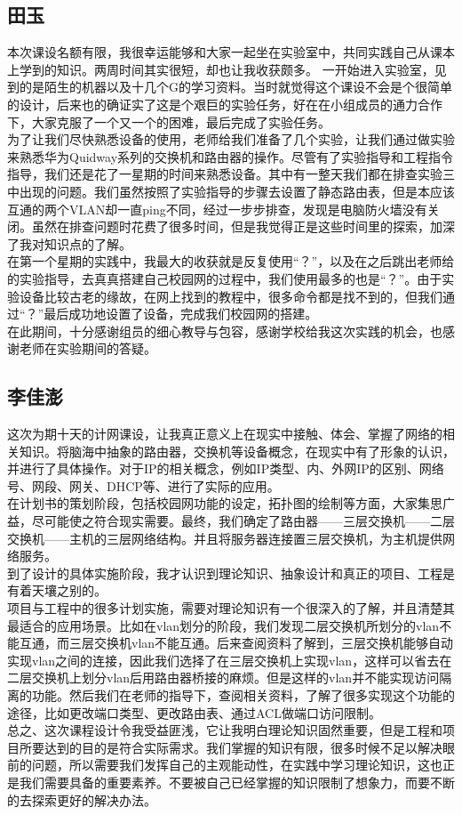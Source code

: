 	\subsection*{田玉}
	本次课设名额有限，我很幸运能够和大家一起坐在实验室中，共同实践自己从课本上学到的知识。两周时间其实很短，却也让我收获颇多。
\indent 一开始进入实验室，见到的是陌生的机器以及十几个G的学习资料。当时就觉得这个课设不会是个很简单的设计，后来也的确证实了这是个艰巨的实验任务，好在在小组成员的通力合作下，大家克服了一个又一个的困难，最后完成了实验任务。\\
\indent 为了让我们尽快熟悉设备的使用，老师给我们准备了几个实验，让我们通过做实验来熟悉华为Quidway系列的交换机和路由器的操作。尽管有了实验指导和工程指令指导，我们还是花了一星期的时间来熟悉设备。其中有一整天我们都在排查实验三中出现的问题。我们虽然按照了实验指导的步骤去设置了静态路由表，但是本应该互通的两个VLAN却一直ping不同，经过一步步排查，发现是电脑防火墙没有关闭。虽然在排查问题时花费了很多时间，但是我觉得正是这些时间里的探索，加深了我对知识点的了解。\\
\indent 在第一个星期的实践中，我最大的收获就是反复使用“？”，以及在之后跳出老师给的实验指导，去真真搭建自己校园网的过程中，我们使用最多的也是“？”。由于实验设备比较古老的缘故，在网上找到的教程中，很多命令都是找不到的，但我们通过“？”最后成功地设置了设备，完成我们校园网的搭建。\\
\indent 在此期间，十分感谢组员的细心教导与包容，感谢学校给我这次实践的机会，也感谢老师在实验期间的答疑。\\
	\subsection*{李佳澎}
\indent	这次为期十天的计网课设，让我真正意义上在现实中接触、体会、掌握了网络的相关知识。将脑海中抽象的路由器，交换机等设备概念，在现实中有了形象的认识，并进行了具体操作。对于IP的相关概念，例如IP类型、内、外网IP的区别、网络号、网段、网关、DHCP等、进行了实际的应用。\\
\indent	在计划书的策划阶段，包括校园网功能的设定，拓扑图的绘制等方面，大家集思广益，尽可能使之符合现实需要。最终，我们确定了路由器——三层交换机——二层交换机——主机的三层网络结构。并且将服务器连接置三层交换机，为主机提供网络服务。\\
\indent	到了设计的具体实施阶段，我才认识到理论知识、抽象设计和真正的项目、工程是有着天壤之别的。\\
\indent 项目与工程中的很多计划实施，需要对理论知识有一个很深入的了解，并且清楚其最适合的应用场景。比如在vlan划分的阶段，我们发现二层交换机所划分的vlan不能互通，而三层交换机vlan不能互通。后来查阅资料了解到，三层交换机能够自动实现vlan之间的连接，因此我们选择了在三层交换机上实现vlan，这样可以省去在二层交换机上划分vlan后用路由器桥接的麻烦。但是这样的vlan并不能实现访问隔离的功能。然后我们在老师的指导下，查阅相关资料，了解了很多实现这个功能的途径，比如更改端口类型、更改路由表、通过ACL做端口访问限制。\\
\indent	总之、这次课程设计令我受益匪浅，它让我明白理论知识固然重要，但是工程和项目所要达到的目的是符合实际需求。我们掌握的知识有限，很多时候不足以解决眼前的问题，所以需要我们发挥自己的主观能动性，在实践中学习理论知识，这也正是我们需要具备的重要素养。不要被自己已经掌握的知识限制了想象力，而要不断的去探索更好的解决办法。
